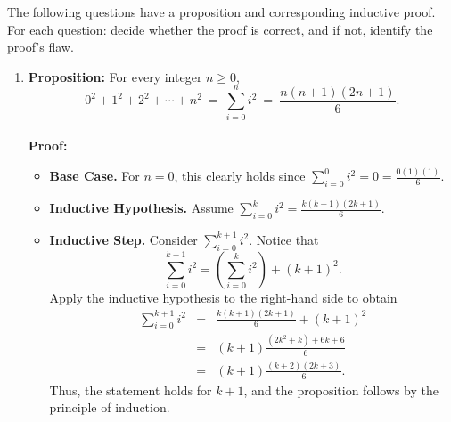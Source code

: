 \documentclass[11pt, preview]{standalone} %
\begin{document}

\noindent The following questions have a proposition and corresponding inductive proof. For each question: decide whether the proof is correct, and if not, identify the proof's flaw.
\begin{enumerate}
\item 
{\bf Proposition:} For every integer $n \ge 0$, 
\[
0^2 + 1^2 + 2^2 + \cdots + n^2 \ =\  \sum_{i=0}^n i^2 \ =\ \frac{n(n+1)(2n+1)}{6}.
\] 
\\
{\bf Proof:} 
\begin{itemize}
\item {\bf Base Case.} For $n = 0$, this clearly holds since $\sum_{i=0}^0{i^2} = 0 = \frac{0(1)(1)}{6}$. 
\item {\bf Inductive Hypothesis.} Assume $\sum_{i = 0}^k{i^2} = \frac{k(k+1)(2k+1)}{6}$.
\item {\bf Inductive Step.} Consider $\sum_{i = 0}^{k+1}{i^2}$. Notice that
\begin{equation}
\sum_{i = 0}^{k+1}{i^2} = \left( \sum_{i = 0}^{k}{i^2} \right)+ (k+1)^2.
\end{equation}
Apply the inductive hypothesis to the right-hand side to obtain
\begin{eqnarray}
\sum_{i = 0}^{k+1}{i^2} &=& \frac{k(k+1)(2k+1)}{6} + (k+1)^2 \\
&=& (k+1) \frac{(2k^2 + k) + 6k + 6}{6} \\
&=& (k+1) \frac{(k+2)(2k+3)}{6}.
\end{eqnarray}
Thus, the statement holds for $k+1$, and the proposition follows by the principle of induction. 
\end{itemize}
\begin{enumerate}
\end{enumerate}
\end{enumerate}
\end{document}
